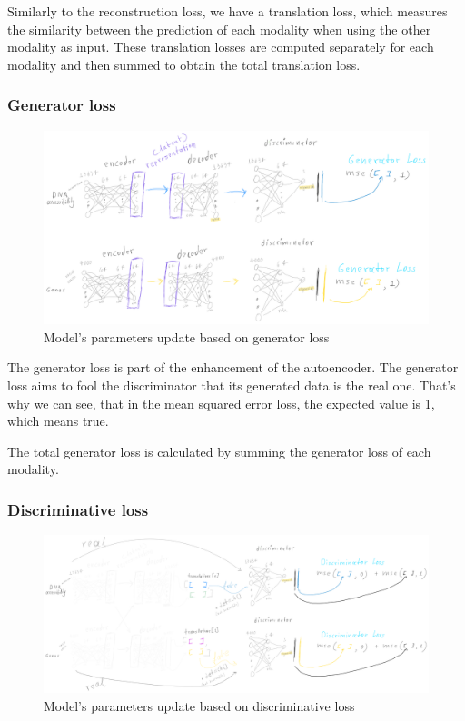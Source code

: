 \documentclass[12pt, a4paper]{article}
\begin{document}
Similarly to the reconstruction loss, we have a translation loss, which measures the similarity between the prediction of each modality when using the other modality as input. These translation losses are computed separately for each modality and then summed to obtain the total translation loss.

\clearpage


\subsubsection{Generator loss}
\label{sec:generatorloss}

\begin{figure}[h!]
  \centering
  \includegraphics[width=\textwidth]{generator_loss.png}
  \caption{Model's parameters update based on generator loss}
\end{figure}

The generator loss is part of the enhancement of the autoencoder. The generator loss aims to fool the discriminator that its generated data is the real one. That's why we can see, that in the mean squared error loss, the expected value is 1, which means true.

The total generator loss is calculated by summing the generator loss of each modality.

\clearpage

\subsubsection{Discriminative loss}
\label{sec:discriminativeloss}

\begin{figure}[h!]
  \centering
  \includegraphics[width=\textwidth]{discriminator_loss.png}
  \caption{Model's parameters update based on discriminative loss}
\end{figure}
\end{document}
